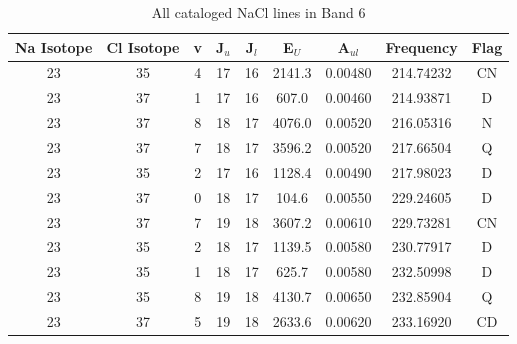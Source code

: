 \begin{table*}[htp]
\centering
\caption{All cataloged NaCl lines in Band 6}
\begin{tabular}{ccccccccc}
\label{tab:Na_detections_B6}
Na Isotope & Cl Isotope & v & J$_u$ & J$_l$ & E$_U$ & A$_{ul}$ & Frequency & Flag \\
\hline
23 & 35 & 4 & 17 & 16 & 2141.3 & 0.00480 & 214.74232 & CN \\
23 & 37 & 1 & 17 & 16 & 607.0 & 0.00460 & 214.93871 & D \\
23 & 37 & 8 & 18 & 17 & 4076.0 & 0.00520 & 216.05316 & N \\
23 & 37 & 7 & 18 & 17 & 3596.2 & 0.00520 & 217.66504 & Q \\
23 & 35 & 2 & 17 & 16 & 1128.4 & 0.00490 & 217.98023 & D \\
23 & 37 & 0 & 18 & 17 & 104.6 & 0.00550 & 229.24605 & D \\
23 & 37 & 7 & 19 & 18 & 3607.2 & 0.00610 & 229.73281 & CN \\
23 & 35 & 2 & 18 & 17 & 1139.5 & 0.00580 & 230.77917 & D \\
23 & 35 & 1 & 18 & 17 & 625.7 & 0.00580 & 232.50998 & D \\
23 & 35 & 8 & 19 & 18 & 4130.7 & 0.00650 & 232.85904 & Q \\
23 & 37 & 5 & 19 & 18 & 2633.6 & 0.00620 & 233.16920 & CD \\
\hline
\end{tabular}

\par 
\end{table*}
